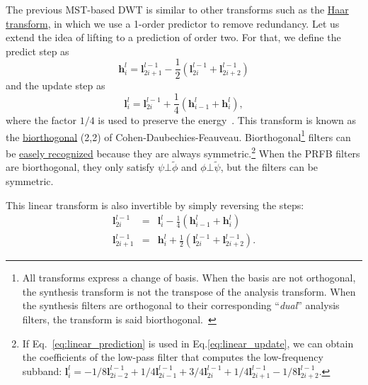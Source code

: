 The previous MST-based DWT is similar to other transforms such as the
\href{https://en.wikipedia.org/wiki/Haar_wavelet}{Haar transform}, in
which we use a 1-order predictor to remove redundancy. Let us extend
the idea of lifting to a prediction of order two. For that, we define
the predict step as
\begin{equation}
  {\mathbf h}^l_i = {\mathbf l}^{l-1}_{2i+1} - \frac{1}{2}({\mathbf l}^{l-1}_{2i} + {\mathbf l}^{l-1}_{2i+2})
  \label{eq:linear_prediction}
\end{equation}
and the update step as
\begin{equation}
  {\mathbf l}^l_i = {\mathbf l}^{l-1}_{2i} + \frac{1}{4}({\mathbf h}^l_{i-1} + {\mathbf h}^l_i),
  \label{eq:linear_update}
\end{equation}
where the factor $1/4$ is used to preserve the
energy~\cite{sweldens1997building}. This transform is known as the
\href{https://en.wikipedia.org/wiki/Biorthogonal_wavelet}{biorthogonal}
(2,2) of Cohen-Daubechies-Feauveau.  Biorthogonal\footnote{All
transforms express a change of basis. When the basis are not
orthogonal, the synthesis transform is not the transpose of the
analysis transform. When the synthesis filters are orthogonal to their
corresponding ``\emph{dual}'' analysis filters, the transform is said
biorthogonal.~\cite{vetterli2014foundations}} filters can be
\href{https://github.com/Tecnologias-multimedia/Tecnologias-multimedia.github.io/blob/master/contents/transform_coding/explore_wavelet_filters.ipynb}{easely
  recognized} because they are always symmetric.\footnote{If
Eq.~\eqref{eq:linear_prediction} is used in
Eq.\eqref{eq:linear_update}, we can obtain the coefficients of the
low-pass filter that computes the low-frequency subband: ${\mathbf
  l}^l_i=-1/8{\mathbf l}^{l-1}_{2i-2}+1/4{\mathbf
  l}^{l-1}_{2i-1}+3/4{\mathbf l}^{l-1}_{2i}+1/4{\mathbf
  l}^{l-1}_{2i+1}-1/8{\mathbf l}^{l-1}_{2i+2}$.} When the PRFB filters
are biorthogonal, they only satisfy $\psi\bot\tilde\phi$ and
$\phi\bot\tilde\psi$, but the filters can be symmetric.

This linear transform is also invertible by simply reversing the steps:
\begin{equation}
  \begin{array}{rcl}
    {\mathbf l}^{l-1}_{2i} & = & {\mathbf l}^l_i - \frac{1}{4}({\mathbf h}^l_{i-1} + {\mathbf h}^l_i)\\
    {\mathbf l}^{l-1}_{2i+1} & = & {\mathbf h}^l_i + \frac{1}{2}({\mathbf l}^{l-1}_{2i} + {\mathbf l}^{l-1}_{2i+2}).
  \end{array}
\end{equation}

